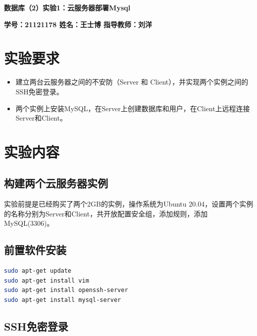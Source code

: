 \documentclass{article}
\begin{document}
 \pingfang
\begin{center}
    \textbf{\huge 数据库（2）实验1：云服务器部署Mysql}
\end{center}
\begin{center}
    \textbf{\large \textbf{学号：21121178 \quad 姓名：王士博 \quad 指导教师：刘洋}}
\end{center}
\hrulefill

\section{实验要求}

\begin{itemize}
  \item 建立两台云服务器之间的不安防（Server 和 Client），并实现两个实例之间的SSH免密登录。
  \item 两个实例上安装MySQL，在Server上创建数据库和用户，在Client上远程连接Server和Client。
\end{itemize}

\section{实验内容}

\subsection{构建两个云服务器实例}

实验前提是已经购买了两个2GB的实例，操作系统为Ubuntu 20.04，设置两个实例的名称分别为Server和Client，共开放配置安全组，添加规则，添加MySQL(3306)。

\subsection{前置软件安装}

\begin{lstlisting}[language=bash]
sudo apt-get update
sudo apt-get install vim
sudo apt-get install openssh-server
sudo apt-get install mysql-server
\end{lstlisting}

\subsection{SSH免密登录}
\end{document}
